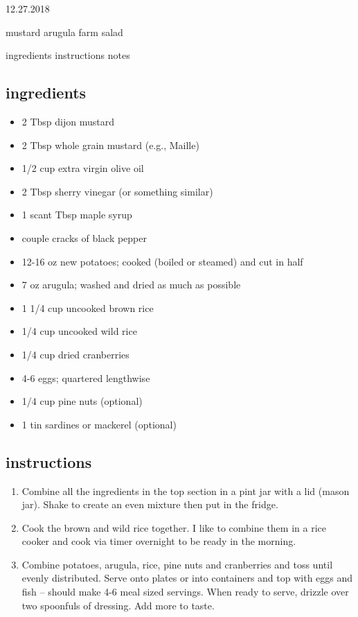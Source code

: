 \documentclass[]{book}
\providecommand{\tightlist}{%
  \setlength{\itemsep}{0pt}\setlength{\parskip}{0pt}}
\begin{document}
12.27.2018

mustard arugula farm salad

ingredients \textbar{}
instructions \textbar{}
notes

\hypertarget{ingredients-10}{%
\subsection{ingredients}\label{ingredients-10}}

\begin{itemize}
\tightlist
\item
  2 Tbsp dijon mustard
\item
  2 Tbsp whole grain mustard (e.g., Maille)
\item
  1/2 cup extra virgin olive oil
\item
  2 Tbsp sherry vinegar (or something similar)
\item
  1 scant Tbsp maple syrup
\item
  couple cracks of black pepper
\item
  12-16 oz new potatoes; cooked (boiled or steamed) and cut in half
\item
  7 oz arugula; washed and dried as much as possible
\item
  1 1/4 cup uncooked brown rice
\item
  1/4 cup uncooked wild rice
\item
  1/4 cup dried cranberries
\item
  4-6 eggs; quartered lengthwise
\item
  1/4 cup pine nuts (optional)
\item
  1 tin sardines or mackerel (optional)
\end{itemize}

\hypertarget{instructions-10}{%
\subsection{instructions}\label{instructions-10}}

\begin{enumerate}
\def\labelenumi{\arabic{enumi}.}
\tightlist
\item
  Combine all the ingredients in the top section in a pint jar with a lid (mason jar). Shake to create an even mixture then put in the fridge.
\item
  Cook the brown and wild rice together. I like to combine them in a rice cooker and cook via timer overnight to be ready in the morning.
\item
  Combine potatoes, arugula, rice, pine nuts and cranberries and toss until evenly distributed. Serve onto plates or into containers
  and top with eggs and fish -- should make 4-6 meal sized servings. When ready to serve, drizzle over two spoonfuls of dressing. Add more to taste.
\end{enumerate}
\end{document}
